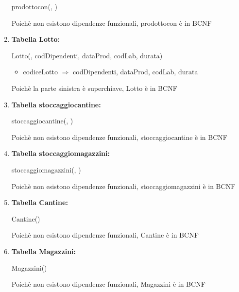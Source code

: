 \documentclass[12pt,a4paper]{article}
\begin{document}
\begin{enumerate}
prodottocon(\underline{}, \underline{})

Poichè non esistono dipendenze funzionali, prodottocon è in BCNF
\vspace{10pt}



\item[] \textbf{Tabella Lotto:}

Lotto(\underline{}, codDipendenti, dataProd, codLab, durata)
\begin{itemize}
\vspace{-5pt}
\item codiceLotto $\Rightarrow$ codDipendenti, dataProd, codLab, durata
\vspace{-5pt}
\end{itemize}
Poichè la parte sinistra è superchiave, Lotto è in BCNF
\vspace{10pt}



\item[] \textbf{Tabella stoccaggiocantine:}

stoccaggiocantine(\underline{}, \underline{})

Poichè non esistono dipendenze funzionali, stoccaggiocantine è in BCNF
\vspace{10pt}



\item[] \textbf{Tabella stoccaggiomagazzini:}

stoccaggiomagazzini(\underline{}, \underline{})

Poichè non esistono dipendenze funzionali, stoccaggiomagazzini è in BCNF
\vspace{10pt}



\item[] \textbf{Tabella Cantine:}

Cantine(\underline{})

Poichè non esistono dipendenze funzionali, Cantine è in BCNF
\vspace{10pt}



\item[] \textbf{Tabella Magazzini:}

Magazzini(\underline{})

Poichè non esistono dipendenze funzionali, Magazzini è in BCNF
\vspace{10pt}




\end{enumerate}
\end{document}
